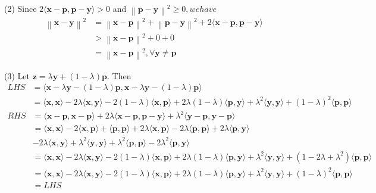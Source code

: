 \documentclass[letterpaper,12pt]{article}
\theoremstyle{definition}
\renewcommand{\vec}[1]{\mathbf{#1}}
\newcommand\norm[1]{\left\lVert#1\right\rVert}
\begin{document}
(2) Since $2\langle \vec{x}-\vec{p} , \vec{p} -\vec{y}\rangle > 0$ and $\norm{\vec{p}-\vec{y}}^2 \geq 0, we have$
\begin{align*}
  \norm{\vec{x} -\vec{y} }^2 &= \norm{\vec{x} -\vec{p} }^2 + \norm{\vec{p} -\vec{y} }^2 + 2 \langle \vec{x} -\vec{p} , \vec{p} -\vec{y}  \rangle \\
  &> \norm{\vec{x} -\vec{p} }^2 + 0 + 0 \\
  &= \norm{\vec{x} -\vec{p} }^2, \forall \vec{y}  \neq \vec{p}
\end{align*}

(3) Let $\vec{z}  = \lambda \vec{y}  + (1-\lambda)\vec{p} .$ Then
\begin{align*}
  LHS &= \langle \vec{x} -\lambda \vec{y}  - (1-\lambda)\vec{p} , \vec{x}  - \lambda \vec{y}  - (1-\lambda) \vec{p} \rangle  \\
    &= \langle \vec{x} , \vec{x} \rangle  - 2\lambda \langle \vec{x} , \vec{y} \rangle  - 2(1-\lambda)\langle \vec{x} , \vec{p} \rangle  + 2\lambda(1-\lambda)\langle \vec{p} , \vec{y} \rangle  + \lambda ^2\langle \vec{y} , \vec{y} \rangle  + (1-\lambda )^2 \langle \vec{p} , \vec{p} \rangle
\end{align*}
\begin{align*}
  RHS &= \langle \vec{x} -\vec{p} , \vec{x} -\vec{p} \rangle  + 2\lambda \langle \vec{x} -\vec{p} , \vec{p} -\vec{y} \rangle  + \lambda ^2 \langle \vec{y} -\vec{p} , \vec{y} -\vec{p} \rangle  \\
  &= \langle \vec{x} ,\vec{x} \rangle  - 2\langle \vec{x} ,\vec{p} \rangle  + \langle \vec{p} ,\vec{p} \rangle  + 2\lambda \langle \vec{x} ,\vec{p} \rangle  - 2\lambda \langle \vec{p} ,\vec{p} \rangle  + 2\lambda \langle \vec{p} ,\vec{y} \rangle \\
   &- 2\lambda \langle \vec{x} ,\vec{y} \rangle  + \lambda ^2\langle \vec{y} ,\vec{y} \rangle  + \lambda ^2 \langle \vec{p}  ,\vec{p} \rangle  - 2\lambda ^2 \langle \vec{p} ,\vec{y} \rangle  \\
  &= \langle \vec{x} ,\vec{x} \rangle  - 2\lambda \langle \vec{x} , \vec{y} \rangle  - 2(1-\lambda )\langle \vec{x} , \vec{p} \rangle  + 2\lambda (1-\lambda )\langle \vec{p}  ,\vec{y} \rangle  + \lambda ^2\langle \vec{y} ,\vec{y} \rangle  + (1-2\lambda +\lambda ^2) \langle \vec{p} ,\vec{p} \rangle  \\
  &= \langle \vec{x} ,\vec{x} \rangle  - 2\lambda \langle \vec{x} , \vec{y} \rangle  - 2(1-\lambda )\langle \vec{x} , \vec{p} \rangle  + 2\lambda (1-\lambda )\langle \vec{p}  ,\vec{y} \rangle  + \lambda ^2\langle \vec{y} ,\vec{y} \rangle  + (1-\lambda )^2 \langle \vec{p} ,\vec{p} \rangle  \\
  &= LHS
\end{align*}
\end{document}
